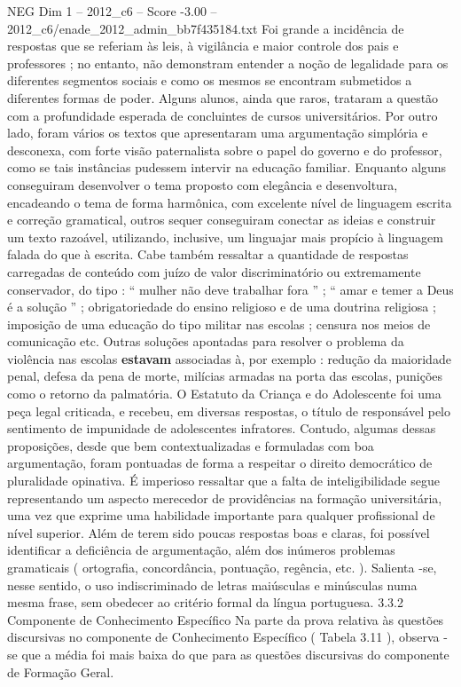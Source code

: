 \begin{textsample}{NEG Dim 1 – 2012\_c6 – Score -3.00 – 2012\_c6/enade\_2012\_admin\_bb7f435184.txt}
Foi grande a incidência de respostas que se referiam às leis, à vigilância e maior controle dos pais e professores ; no entanto, não demonstram entender a noção de legalidade para os diferentes segmentos sociais e como os mesmos se encontram submetidos a diferentes formas de poder.
Alguns alunos, ainda que raros, trataram a questão com a profundidade esperada de concluintes de cursos universitários.
Por outro lado, foram vários os textos que apresentaram uma argumentação simplória e desconexa, com forte visão paternalista sobre o papel do governo e do professor, como se tais instâncias pudessem intervir na educação familiar.
Enquanto alguns conseguiram desenvolver o tema proposto com elegância e desenvoltura, encadeando o tema de forma harmônica, com excelente nível de linguagem escrita e correção gramatical, outros sequer conseguiram conectar as ideias e construir um texto razoável, utilizando, inclusive, um linguajar mais propício à linguagem falada do que à escrita.
Cabe também ressaltar a quantidade de respostas carregadas de conteúdo com juízo de valor discriminatório ou extremamente conservador, do tipo : “ mulher não deve trabalhar fora ” ; “ amar e temer a Deus é a solução ” ; obrigatoriedade do ensino religioso e de uma doutrina religiosa ; imposição de uma educação do tipo militar nas escolas ; censura nos meios de comunicação etc.
Outras soluções apontadas para resolver o problema da violência nas escolas \textbf{estavam} associadas à, por exemplo : redução da maioridade penal, defesa da pena de morte, milícias armadas na porta das escolas, punições como o retorno da palmatória.
O Estatuto da Criança e do Adolescente foi uma peça legal criticada, e recebeu, em diversas respostas, o título de responsável pelo sentimento de impunidade de adolescentes infratores.
Contudo, algumas dessas proposições, desde que bem contextualizadas e formuladas com boa argumentação, foram pontuadas de forma a respeitar o direito democrático de pluralidade opinativa.
É imperioso ressaltar que a falta de inteligibilidade segue representando um aspecto merecedor de providências na formação universitária, uma vez que exprime uma habilidade importante para qualquer profissional de nível superior.
Além de terem sido poucas respostas boas e claras, foi possível identificar a deficiência de argumentação, além dos inúmeros problemas gramaticais ( ortografia, concordância, pontuação, regência, etc. ).
Salienta -se, nesse sentido, o uso indiscriminado de letras maiúsculas e minúsculas numa mesma frase, sem obedecer ao critério formal da língua portuguesa. 3.3.2 Componente de Conhecimento Específico Na parte da prova relativa às questões discursivas no componente de Conhecimento Específico ( Tabela 3.11 ), observa -se que a média foi mais baixa do que para as questões discursivas do componente de Formação Geral.

\end{textsample}
